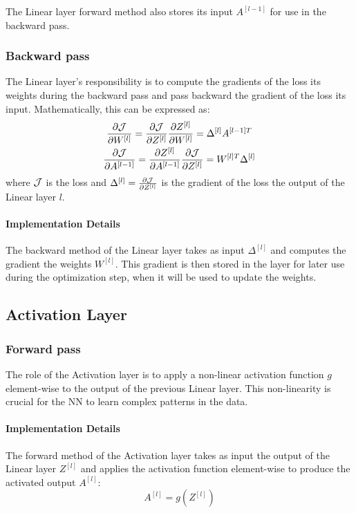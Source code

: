 The Linear layer forward method also stores its input $A^{[l - 1]}$ for use in the backward pass.

\subsubsection{Backward pass}
The Linear layer's responsibility is to compute the gradients of the loss \wrt its weights during the backward pass and pass backward the gradient of the loss \wrt its input. Mathematically, this can be expressed as:
\begin{gather}
    \pdv{\mathcal{J}}{W^{[l]}} = \pdv{\mathcal{J}}{Z^{[l]}} \pdv{Z^{[l]}}{W^{[l]}} = \Delta^{[l]} A^{[l - 1]T}\\
    \pdv{\mathcal{J}}{A^{[l - 1]}} = \pdv{Z^{[l]}}{A^{[l - 1]}} \pdv{\mathcal{J}}{Z^{[l]}} = W^{[l]T} \Delta^{[l]}
\end{gather}
where $\mathcal{J}$ is the loss and $\Delta^{[l]} = \pdv{\mathcal{J}}{Z^{[l]}}$ is the gradient of the loss \wrt the output of the Linear layer $l$.

\paragraph{Implementation Details} The backward method of the Linear layer takes as input $\Delta^{[l]}$ and computes the gradient \wrt the weights $W^{[l]}$. This gradient is then stored in the layer for later use during the optimization step, when it will be used to update the weights.

\subsection{Activation Layer}
\subsubsection{Forward pass}
The role of the Activation layer is to apply a non-linear activation function $g$ element-wise to the output of the previous Linear layer. This non-linearity is crucial for the \acl{NN} to learn complex patterns in the data.

\paragraph{Implementation Details} The forward method of the Activation layer takes as input the output of the Linear layer $Z^{[l]}$ and applies the activation function element-wise to produce the activated output $A^{[l]}$:
\begin{equation}
    A^{[l]} = g(Z^{[l]})
\end{equation}

